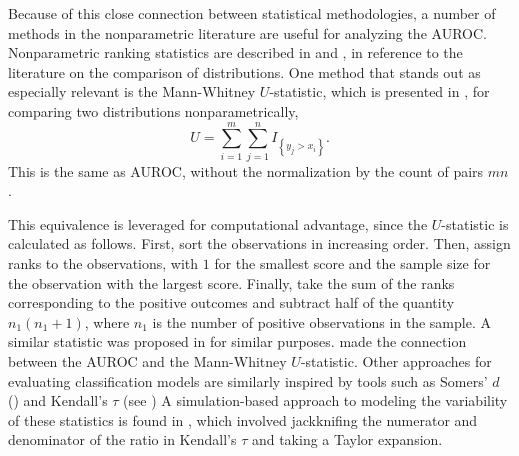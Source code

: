 % 






Because of this close connection between statistical methodologies, a number of methods in the nonparametric literature are useful for analyzing the AUROC.
Nonparametric ranking statistics are described in \citet{lehmann2006} and \citet{kendall1990}, in reference to the literature on the comparison of distributions.
One method that stands out as especially relevant is the
Mann-Whitney $U$-statistic, which is presented in \citet{mannwhitney1947}, for comparing two distributions nonparametrically,
%
\begin{equation}
    U = \sum_{i = 1}^{m} \sum_{j = 1}^{n} I_{\left\{ y_j > x_i \right\}}.
\end{equation}
%
This is the same as AUROC, without the normalization by the count of pairs $m n$.

This equivalence is leveraged for computational advantage, since the $U$-statistic is calculated as follows.
First, sort the observations in increasing order.
Then, assign ranks to the observations, with $1$ for the smallest score and the sample size for the observation with the largest score.
Finally, take the sum of the ranks corresponding to the positive outcomes and subtract
half of the quantity $n_1(n_1 + 1)$,
%
\noindent where $n_1$ is the number of positive observations in the sample.
%
A similar statistic was proposed in \citet{wilcoxon1945} for similar purposes.
\citet{bamber1975} made the connection between the AUROC and the Mann-Whitney $U$-statistic.
Other approaches for evaluating classification models are similarly inspired by tools such as
Somers' $d$ (\citet{somers1962}) and Kendall's $\tau$ (see \citet{kendall1990})
A simulation-based approach to modeling the variability of these statistics is found in \citet{newson2006}, which involved jackknifing the numerator and denominator of the ratio in Kendall's $\tau$ and taking a Taylor expansion.





